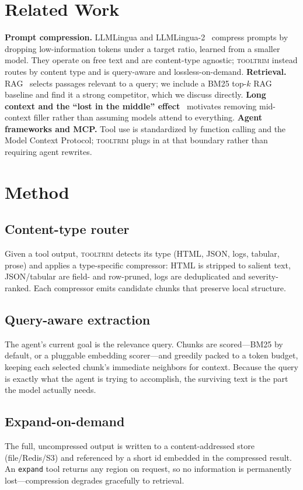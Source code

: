\documentclass[11pt]{article}
\newcommand{\tooltrim}{\textsc{tooltrim}}
\begin{document}
\section{Related Work}
\textbf{Prompt compression.} LLMLingua and LLMLingua-2~\cite{jiang2023llmlingua,
pan2024llmlingua2} compress prompts by dropping low-information tokens under a
target ratio, learned from a smaller model. They operate on free text and are
content-type agnostic; \tooltrim{} instead routes by content type and is
query-aware and lossless-on-demand. \textbf{Retrieval.} RAG~\cite{lewis2020rag}
selects passages relevant to a query; we include a BM25 top-$k$ RAG baseline and
find it a strong competitor, which we discuss directly. \textbf{Long context and
the ``lost in the middle'' effect}~\cite{liu2024lost} motivates removing
mid-context filler rather than assuming models attend to everything.
\textbf{Agent frameworks and MCP.} Tool use is standardized by function calling
and the Model Context Protocol; \tooltrim{} plugs in at that boundary rather than
requiring agent rewrites.

\section{Method}
\subsection{Content-type router}
Given a tool output, \tooltrim{} detects its type (HTML, JSON, logs, tabular,
prose) and applies a type-specific compressor: HTML is stripped to salient text,
JSON/tabular are field- and row-pruned, logs are deduplicated and severity-
ranked. Each compressor emits candidate chunks that preserve local structure.

\subsection{Query-aware extraction}
The agent's current goal is the relevance query. Chunks are scored---BM25 by
default, or a pluggable embedding scorer---and greedily packed to a token budget,
keeping each selected chunk's immediate neighbors for context. Because the query
is exactly what the agent is trying to accomplish, the surviving text is the part
the model actually needs.

\subsection{Expand-on-demand}
The full, uncompressed output is written to a content-addressed store
(file/Redis/S3) and referenced by a short id embedded in the compressed result.
An \texttt{expand} tool returns any region on request, so no information is
permanently lost---compression degrades gracefully to retrieval.
\end{document}
